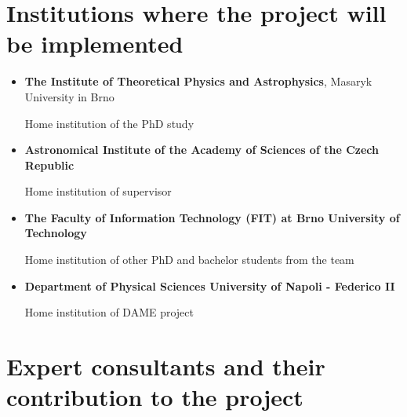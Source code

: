 \bigskip
\section{Institutions where the project will be implemented}

\begin{itemize} \addtolength{\itemsep}{-0.5\baselineskip}

\item {\bf{The Institute of Theoretical Physics and Astrophysics}}, Masaryk
University in Brno 

Home institution of the PhD study

\item {\bf{Astronomical Institute of the Academy of Sciences of the Czech
    Republic}}

Home institution of supervisor

\item {\bf{The Faculty of Information Technology (FIT) at Brno University of Technology}}

Home institution of other PhD and bachelor students from the team

\item {\bf{Department of Physical Sciences University of Napoli - Federico II}}

Home institution of DAME project

\end{itemize}





\break
\section{Expert consultants and their contribution to the project}

